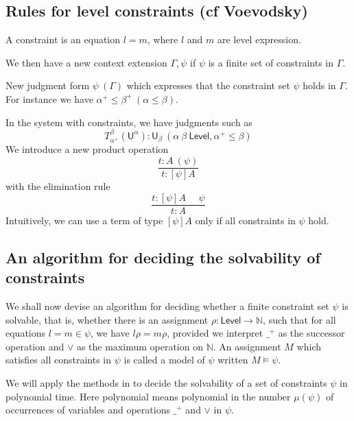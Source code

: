 \documentclass[11pt,a4paper]{article}
\def\UU{\mathsf{U}}
\def\Level{\mathsf{Level}}
\def\Constraint{\mathsf{Constraint}}
\begin{document}
\subsection{Rules for level constraints (cf Voevodsky)}%

A constraint is an equation $l = m$, where $l$ and $m$ are level expression. 

We then have a new context extension $\Gamma,\psi$ if $\psi$ is a finite set of constraints in $\Gamma$.

New judgment form $\psi~(\Gamma)$ which expresses that the constraint set $\psi$
holds in $\Gamma$. For instance we have $\alpha^+\leqslant\beta^+~(\alpha\leqslant\beta)$.

In the system with constraints, we have judgments such as
$$
T_{\alpha^+}^{\beta}(\UU^{\alpha}):\UU_{\beta}~(\alpha~\beta~\Level,\alpha^+\leqslant\beta)
$$
We introduce a new product operation
$$
\frac{t:A~(\psi)}{t:[\psi]A}
$$
with the elimination rule
$$
\frac{t:[\psi]A~~~~~~\psi}{t:A}
$$
Intuitively, we can use a term of type $[\psi]A$ only if all constraints in $\psi$ hold.

\subsection{An algorithm for deciding the solvability of constraints}

We shall now devise an algorithm for deciding whether a finite constraint set $\psi$ is solvable, that is, whether there is an assignment $\rho : \Level \to \mathbb{N}$, such that for all equations $l = m \in \psi$, we have $l\rho = m\rho$, provided we interpret $\_^+$ as the successor operation and $\vee$ as the maximum operation on $\mathbb{N}$. An assignment $M$ which satisfies all constraints in $\psi$ is called a model of $\psi$ written $M \models \psi$.

We will apply the methods in \cite{BNR08} to decide
the solvability of a set of constraints $\psi$ in polynomial time.
Here polynomial means polynomial in the number $\mu(\psi)$ of occurrences of
variables and operations $\_^+$ and $\vee$ in  $\psi$. 

\end{document}
